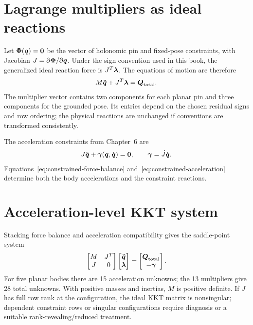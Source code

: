 \documentclass[../main.tex]{subfiles}
\begin{document}
\section{Lagrange multipliers as ideal reactions}

Let $\boldsymbol{\Phi}(\boldsymbol{q})=\boldsymbol{0}$ be the vector of holonomic pin and fixed-pose constraints, with Jacobian $J=\partial\boldsymbol{\Phi}/\partial\boldsymbol{q}$. Under the sign convention used in this book, the generalized ideal reaction force is $J^T\boldsymbol{\lambda}$. The equations of motion are therefore
\begin{equation}
	M\ddot{\boldsymbol{q}}+J^T\boldsymbol{\lambda}
	=\boldsymbol{Q}_{\mathrm{total}}.
	\label{eq:constrained-force-balance}
\end{equation}
The multiplier vector contains two components for each planar pin and three components for the grounded pose. Its entries depend on the chosen residual signs and row ordering; the physical reactions are unchanged if conventions are transformed consistently.

The acceleration constraints from Chapter~6 are
\begin{equation}
	J\ddot{\boldsymbol{q}}+\boldsymbol{\gamma}(\boldsymbol{q},\dot{\boldsymbol{q}})=\boldsymbol{0},
	\qquad \boldsymbol{\gamma}=\dot J\dot{\boldsymbol{q}}.
	\label{eq:constrained-acceleration}
\end{equation}
Equations~\eqref{eq:constrained-force-balance} and~\eqref{eq:constrained-acceleration} determine both the body accelerations and the constraint reactions.

\section{Acceleration-level KKT system}

Stacking force balance and acceleration compatibility gives the saddle-point system
\begin{equation}
	\begin{bmatrix}
		M & J^T\\
		J & 0
	\end{bmatrix}
	\begin{bmatrix}
		\ddot{\boldsymbol{q}}\\\boldsymbol{\lambda}
	\end{bmatrix}
	=
	\begin{bmatrix}
		\boldsymbol{Q}_{\mathrm{total}}\\-\boldsymbol{\gamma}
	\end{bmatrix}.
	\label{eq:constrained-kkt}
\end{equation}
For five planar bodies there are 15 acceleration unknowns; the 13 multipliers give 28 total unknowns. With positive masses and inertias, $M$ is positive definite. If $J$ has full row rank at the configuration, the ideal KKT matrix is nonsingular; dependent constraint rows or singular configurations require diagnosis or a suitable rank-revealing/reduced treatment.
\end{document}
